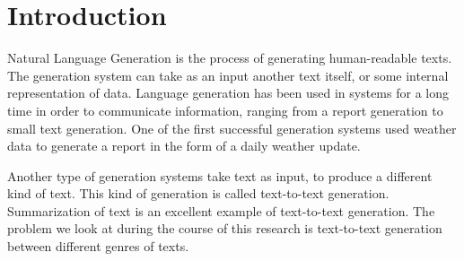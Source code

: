 \chapter{Introduction}

Natural Language Generation is the process of generating human-readable texts. The generation system can take as an input another text itself, or some internal representation of data. Language generation has been used in systems for a long time in order to communicate information, ranging from a report generation to small text generation. One of the first successful generation systems used weather data to generate a report in the form of a daily weather update. 

Another type of generation systems take text as input, to produce a different kind of text. This kind of generation is called text-to-text generation. Summarization of text is an excellent example of text-to-text generation. The problem we look at during the course of this research is text-to-text generation between different genres of texts.